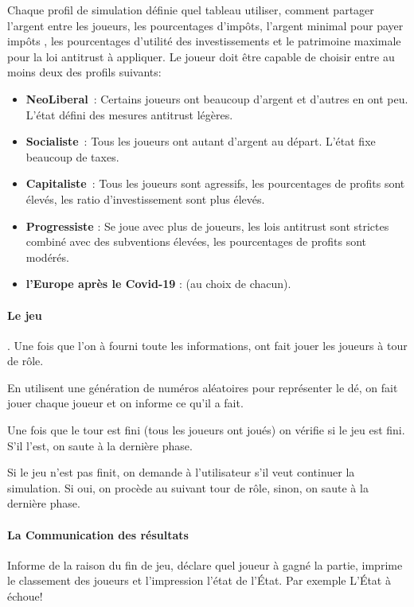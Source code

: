 \documentclass[12pt]{article}
\begin{document}
  Chaque profil de simulation définie quel tableau utiliser, comment partager l'argent entre les joueurs, les pourcentages d'impôts, l'argent minimal pour payer impôts , les pourcentages d'utilité des investissements et le patrimoine maximale pour la loi antitrust à appliquer. 
  Le joueur doit être capable de choisir entre au moins deux des profils suivants: 
  \begin{itemize}
  	\item \textbf{NeoLiberal}~: Certains joueurs ont beaucoup d'argent et d'autres en ont peu. L'état défini des mesures antitrust légères.
  	\item \textbf{Socialiste}~: Tous les joueurs ont autant d'argent au départ. L'état fixe beaucoup de taxes.
  	\item \textbf{Capitaliste}~: Tous les joueurs sont agressifs, les pourcentages de profits sont élevés,  les ratio d'investissement sont plus élevés.
  	\item \textbf{Progressiste} : Se joue avec plus de joueurs, les lois antitrust sont strictes combiné avec des subventions élevées, les pourcentages de profits sont modérés.
  	\item \textbf{l'Europe après le Covid-19} : (au choix de chacun).
\end{itemize}
 
 
  \paragraph{Le jeu}. 
  	Une fois que l'on à fourni toute les informations, ont fait jouer les joueurs à tour de rôle.
	
	 En utilisent une génération de numéros aléatoires pour représenter le dé, on fait jouer chaque joueur et on informe ce qu'il a fait.
	 
	 Une fois que le tour est fini (tous les joueurs ont joués) on vérifie si le jeu est fini. S'il l'est, on saute à la dernière phase. 
	 
	 Si le jeu n'est pas finit, on demande à l'utilisateur s'il veut continuer la simulation. Si oui, on procède au suivant tour de rôle, sinon, on saute à la dernière phase.
	
  
  \paragraph{La Communication des résultats} Informe de la raison du fin de jeu, déclare quel joueur à gagné la partie, imprime le classement des joueurs et l'impression l'état de l'État. 
  	Par exemple
\begingroup\makeatletter\def\@currenvir{verbatim}
\verbatim
	  L'État à échoue! 
	
\end{document}
